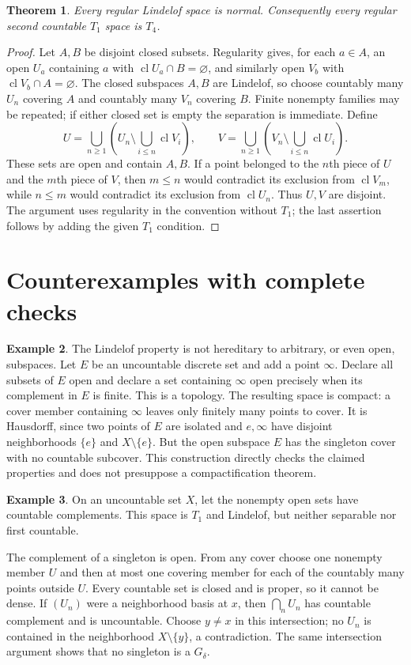 \documentclass[11pt,oneside,openany]{book}
\newtheorem{theorem}{Theorem}[chapter]
\theoremstyle{definition}
\newtheorem{example}[theorem]{Example}
\theoremstyle{remark}
\DeclareMathOperator{\cl}{cl}
\begin{document}
\begin{theorem}\label{d10:08:regular-lindelof-normal}
Every regular Lindelof space is normal. Consequently every regular second countable $T_1$ space is $T_4$.
\end{theorem}
\begin{proof}
Let $A,B$ be disjoint closed subsets. Regularity gives, for each $a\in A$, an open $U_a$ containing $a$ with $\cl U_a\cap B=\varnothing$, and similarly open $V_b$ with $\cl V_b\cap A=\varnothing$. The closed subspaces $A,B$ are Lindelof, so choose countably many $U_n$ covering $A$ and countably many $V_n$ covering $B$. Finite nonempty families may be repeated; if either closed set is empty the separation is immediate. Define
\[
 U=\bigcup_{n\geq1}\left(U_n\setminus\bigcup_{i\leq n}\cl V_i\right),\qquad
 V=\bigcup_{n\geq1}\left(V_n\setminus\bigcup_{i\leq n}\cl U_i\right).
\]
These sets are open and contain $A,B$. If a point belonged to the $n$th piece of $U$ and the $m$th piece of $V$, then $m\leq n$ would contradict its exclusion from $\cl V_m$, while $n\leq m$ would contradict its exclusion from $\cl U_n$. Thus $U,V$ are disjoint. The argument uses regularity in the convention without $T_1$; the last assertion follows by adding the given $T_1$ condition.
\end{proof}

\section{Counterexamples with complete checks}
\begin{example}\label{d10:08:lindelof-subspace-failure}
The Lindelof property is not hereditary to arbitrary, or even open, subspaces. Let $E$ be an uncountable discrete set and add a point $\infty$. Declare all subsets of $E$ open and declare a set containing $\infty$ open precisely when its complement in $E$ is finite. This is a topology. The resulting space is compact: a cover member containing $\infty$ leaves only finitely many points to cover. It is Hausdorff, since two points of $E$ are isolated and $e,\infty$ have disjoint neighborhoods $\{e\}$ and $X\setminus\{e\}$. But the open subspace $E$ has the singleton cover with no countable subcover. This construction directly checks the claimed properties and does not presuppose a compactification theorem.
\end{example}

\begin{example}\label{d10:08:cocountable}
On an uncountable set $X$, let the nonempty open sets have countable complements. This space is $T_1$ and Lindelof, but neither separable nor first countable.

The complement of a singleton is open. From any cover choose one nonempty member $U$ and then at most one covering member for each of the countably many points outside $U$. Every countable set is closed and is proper, so it cannot be dense. If $(U_n)$ were a neighborhood basis at $x$, then $\bigcap_nU_n$ has countable complement and is uncountable. Choose $y\ne x$ in this intersection; no $U_n$ is contained in the neighborhood $X\setminus\{y\}$, a contradiction. The same intersection argument shows that no singleton is a $G_\delta$.
\end{example}
\end{document}
